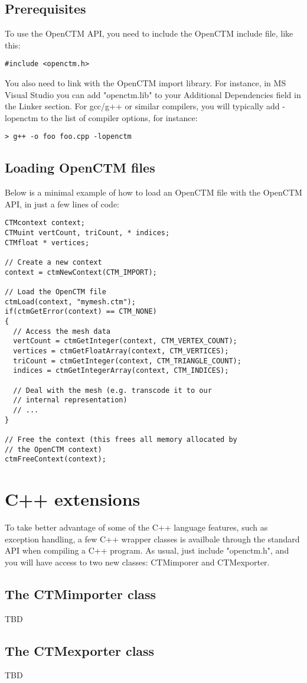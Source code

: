 \section{Prerequisites}
To use the OpenCTM API, you need to include the OpenCTM include file, like this:

\begin{lstlisting}
#include <openctm.h>
\end{lstlisting}

You also need to link with the OpenCTM import library. For instance, in MS
Visual Studio you can add "openctm.lib" to your Additional Dependencies field
in the Linker section. For gcc/g++ or similar compilers, you will typically
add -lopenctm to the list of compiler options, for instance:

\begin{lstlisting}
> g++ -o foo foo.cpp -lopenctm
\end{lstlisting}


\section{Loading OpenCTM files}
Below is a minimal example of how to load an OpenCTM file with the OpenCTM API,
in just a few lines of code:

\begin{lstlisting}
CTMcontext context;
CTMuint vertCount, triCount, * indices;
CTMfloat * vertices;

// Create a new context
context = ctmNewContext(CTM_IMPORT);

// Load the OpenCTM file
ctmLoad(context, "mymesh.ctm");
if(ctmGetError(context) == CTM_NONE)
{
  // Access the mesh data
  vertCount = ctmGetInteger(context, CTM_VERTEX_COUNT);
  vertices = ctmGetFloatArray(context, CTM_VERTICES);
  triCount = ctmGetInteger(context, CTM_TRIANGLE_COUNT);
  indices = ctmGetIntegerArray(context, CTM_INDICES);

  // Deal with the mesh (e.g. transcode it to our
  // internal representation)
  // ...
}

// Free the context (this frees all memory allocated by
// the OpenCTM context)
ctmFreeContext(context);
\end{lstlisting}




\chapter{C++ extensions}
To take better advantage of some of the C++ language features, such as
exception handling, a few C++ wrapper classes is availbale through the standard
API when compiling a C++ program. As usual, just include "openctm.h", and you
will have access to two new classes: CTMimporer and CTMexporter.


\section{The CTMimporter class}
TBD


\section{The CTMexporter class}
TBD



